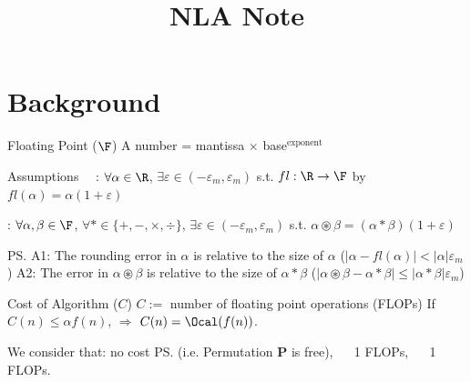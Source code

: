 \documentclass{note}
\title{NLA Note}
\author{}
\begin{document}
\maketitle
\thispagestyle{fancy}

\section{Background}

\begin{MyTh}{Floating Point ($\F$)}
    A number = mantissa $\times$ base$^{\text{exponent}}$ \quad {}
\end{MyTh}

\begin{MyTh}{Assumptions}
     \ \ : $\forall\alpha\in\R$, $\exists \varepsilon\in(-\varepsilon_m,\varepsilon_m)$ s.t. $fl:\R\to\F$ by $fl(\alpha)=\alpha(1+\varepsilon)$
    
    \qquad\qquad\qquad{} \hspace{65pt} : $\forall\alpha,\beta\in\F$, $\forall *\in\{+,-,\times,\div\}$, $\exists \varepsilon\in(-\varepsilon_m,\varepsilon_m)$ s.t. $\alpha \circledast \beta= (\alpha* \beta)(1+\varepsilon)$

    \vspace{-0.09cm}\hspace{2cm}\ps{A1: The rounding error in $\alpha$ is relative to the size of $\alpha$ ($|\alpha-fl(\alpha)|<|\alpha|\varepsilon_m$) \quad A2: The error in $\alpha \circledast \beta$ is relative to the size of $\alpha * \beta$ ($|\alpha \circledast \beta - \alpha * \beta|\le|\alpha * \beta|\varepsilon_m$)}
\end{MyTh}

\begin{MyTh}{Cost of Algorithm ($C$)}
    $C:=$ number of floating point operations (FLOPs) \qquad If $C(n)\le\alpha f(n)$, $\Rightarrow$ $C(n)=\Ocal(f(n))$.

    \quad We consider that:  no cost \ps{(i.e. Permutation $\mathbf{P}$ is free)}, \ \  1 FLOPs, \ \ \ok{$\sqrt{~~~~}$} 1 FLOPs.
\end{MyTh}
\end{document}
